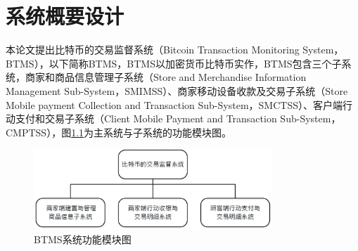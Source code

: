 \chapter{系统概要设计} 


	本论文提出比特币的交易监督系统（Bitcoin Transaction Monitoring System，BTMS）\supercite{Blockchain-basedpaymentcollectionsupervisionsystemusingpervasiveBitcoindigitalwallet}，以下简称BTMS，BTMS以加密货币比特币实作，BTMS包含三个子系统，商家和商品信息管理子系统（Store and Merchandise Information Management Sub-System，SMIMSS）、商家移动设备收款及交易子系统（Store Mobile payment Collection and Transaction Sub-System，SMCTSS）、客户端行动支付和交易子系统（Client Mobile Payment and Transaction Sub-System，CMPTSS），图\ref{model0}为主系统与子系统的功能模块图。

	\begin{figure}[!htbp]
		\centering
		\includegraphics[width = 0.8\textwidth]{model0.jpg}
		\caption{BTMS系统功能模块图}\label{model0}
	\end{figure}

